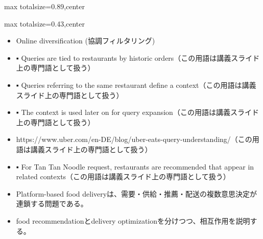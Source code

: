 \begin{minipage}[t]{0.58\textwidth}
\begin{adjustbox}{max totalsize={\textwidth}{0.89\textheight},center}
\begin{minipage}{\textwidth}
\end{minipage}
\end{adjustbox}
\end{minipage}


\clearpage
{}
\begin{minipage}[t]{0.405\textwidth}
\begin{adjustbox}{max totalsize={\textwidth}{0.43\textheight},center}
\begin{minipage}{\textwidth}\scriptsize
{}\begin{itemize}
\item Online diversification (協調フィルタリング)
\item ▪ Queries are tied to restaurants by historic orders（この用語は講義スライド上の専門語として扱う）
\item ▪ Queries referring to the same restaurant define a context（この用語は講義スライド上の専門語として扱う）
\item ▪ The context is used later on for query expansion（この用語は講義スライド上の専門語として扱う）
\item https://www.uber.com/en-DE/blog/uber-eats-query-understanding/（この用語は講義スライド上の専門語として扱う）
\item ▪ For Tan Tan Noodle request, restaurants are recommended that appear in related contexts（この用語は講義スライド上の専門語として扱う）
\end{itemize}\begin{itemize}
\item Platform-based food deliveryは、需要・供給・推薦・配送の複数意思決定が連鎖する問題である。
\item food recommendationとdelivery optimizationを分けつつ、相互作用を説明する。
\end{itemize}
\end{minipage}
\end{adjustbox}
\end{minipage}\hfill
